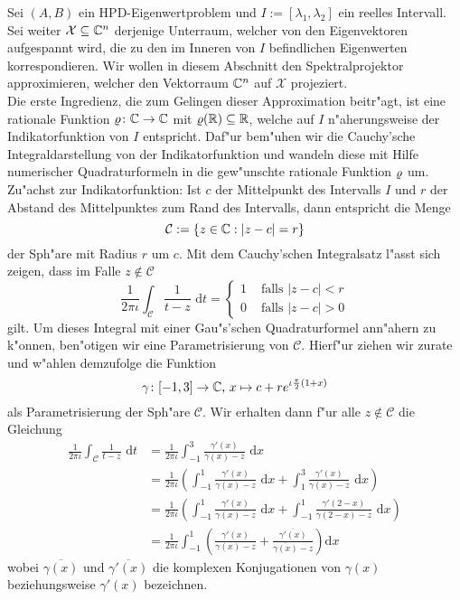 Sei $(A,B)$ ein HPD-Eigenwertproblem und $I:=[\lambda_1, \lambda_2]$ ein reelles Intervall. Sei weiter $\mathcal{X}\subseteq\mathbb{C}^n$ derjenige Unterraum, welcher von den Eigenvektoren aufgespannt wird, die zu den im Inneren von $I$ befindlichen Eigenwerten korrespondieren. Wir wollen in diesem Abschnitt den Spektralprojektor approximieren, welcher den Vektorraum $\mathbb{C}^n$ auf $\mathcal{X}$ projeziert.\\

Die erste Ingredienz, die zum Gelingen dieser Approximation beitr"agt, ist eine rationale Funktion $\varrho\colon\mathbb{C}\to\mathbb{C}$ mit $\varrho(\mathbb{R}) \subseteq \mathbb{R}$, welche auf $I$ n"aherungsweise der Indikatorfunktion von $I$ entspricht.
Daf"ur bem"uhen wir die Cauchy'sche Integraldarstellung von der Indikatorfunktion und
wandeln diese mit Hilfe numerischer Quadraturformeln in die gew"unschte
rationale Funktion $\varrho$ um.\\

Zu"achst zur Indikatorfunktion: Ist $c$ der Mittelpunkt des Intervalls $I$ und
$r$ der Abstand des Mittelpunktes zum Rand des Intervalls, dann entspricht die Menge
\[
\mathcal{C} := \{z\in\mathbb{C} : |z-c| = r\}
\]
der Sph"are mit Radius $r$ um $c$. Mit dem Cauchy'schen Integralsatz
l"asst sich zeigen, dass im Falle $z\notin \mathcal{C}$
\[
\frac{1}{2\pi\iota}\int_{ \mathcal{C}}\frac{1}{t-z}\text{ d}t
= \begin{cases}1 &\text{ falls }|z-c| < r \\ 0 &\text{ falls }|z-c| > 0 \end{cases}
\]
gilt. Um dieses Integral mit einer Gau"s'schen Quadraturformel ann"ahern zu k"onnen, ben"otigen wir eine Parametrisierung von $\mathcal{C}$. Hierf"ur ziehen wir \cite{ptep} zurate und w"ahlen demzufolge
die Funktion
\[
\gamma\colon[-1,3]\to\mathbb{C}\text{, }
x\mapsto c+re^{\iota \frac{\pi}{2}(1+x)}
\]
als Parametrisierung der Sph"are $\mathcal{C}$.
Wir erhalten dann f"ur alle $z\notin\mathcal{C}$ die Gleichung
\begin{align*}
\frac{1}{2\pi\iota}\int_{ \mathcal{C}}\frac{1}{t-z}\text{ d}t
&= \frac{1}{2\pi\iota} \int_{-1}^3 \frac{\gamma'(x)}{\gamma(x)-z}\text{ d}x \\
&= \frac{1}{2\pi\iota} \left( \int_{-1}^1 \frac{\gamma'(x)}{\gamma(x)-z} \text{ d}x +
\int_{1}^3\frac{\gamma'(x)}{\gamma(x)-z}\text{ d}x \right) \\
&= \frac{1}{2\pi\iota} \left( \int_{-1}^1 \frac{\gamma'(x)}{\gamma(x)-z} \text{ d}x +
\int_{-1}^1\frac{\gamma'(2-x)}{\gamma(2-x)-z}\text{ d}x \right) \\
&= \frac{1}{2\pi\iota} \int_{-1}^1 \left( \frac{\gamma'(x)}{\gamma(x)-z} +
\frac{\overline{\gamma'(x)}}{\overline{\gamma(x)}-z}\right)\text{d}x
\end{align*}
wobei $\overline{\gamma(x)}$ und $\overline{\gamma'(x)}$ die komplexen Konjugationen
von $\gamma(x)$ beziehungsweise $\gamma'(x)$ bezeichnen.

